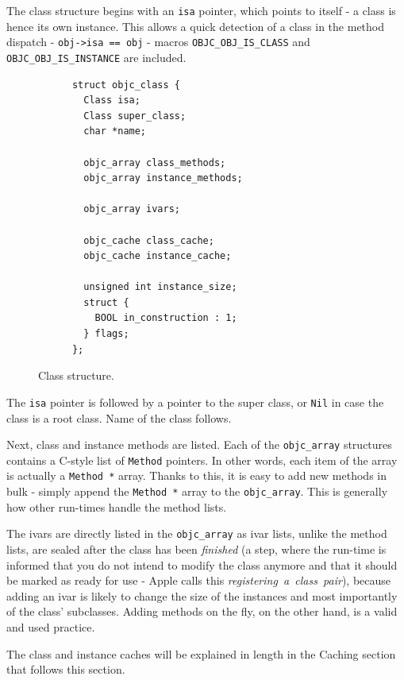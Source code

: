 The class structure begins with an \verb=isa= pointer, which points to itself - a class is hence its own instance. This allows a quick detection of a class in the method dispatch - \verb+obj->isa == obj+ - macros \verb=OBJC_OBJ_IS_CLASS= and \newline{}\verb=OBJC_OBJ_IS_INSTANCE= are included.

\begin{figure}[H] 
  
    \begin{verbatim}
      struct objc_class {
        Class isa;
        Class super_class;
        char *name;
        
        objc_array class_methods;
        objc_array instance_methods;
        
        objc_array ivars;
        
        objc_cache class_cache;
        objc_cache instance_cache;
        
        unsigned int instance_size;
        struct {
          BOOL in_construction : 1;
        } flags;
      };
    \end{verbatim}

  \centering{}
  \caption{Class structure.}
  \label{fig:class_struct}
\end{figure}

The \verb=isa= pointer is followed by a pointer to the super class, or \verb=Nil= in case the class is a root class. Name of the class follows.

Next, class and instance methods are listed. Each of the \verb=objc_array= structures contains a C-style list of \verb=Method= pointers. In other words, each item of the array is actually a \verb=Method *= array. Thanks to this, it is easy to add new methods in bulk - simply append the \verb=Method *= array to the \verb=objc_array=. This is generally how other run-times handle the method lists.

The ivars are directly listed in the \verb=objc_array= as ivar lists, unlike the method lists, are sealed after the class has been \emph{finished} (a step, where the run-time is informed that you do not intend to modify the class anymore and that it should be marked as ready for use - Apple calls this \emph{registering\ a\ class\ pair}), because adding an ivar is likely to change the size of the instances and most importantly of the class' subclasses. Adding methods on the fly, on the other hand, is a valid and used practice.

The class and instance caches will be explained in length in the Caching section that follows this section.

